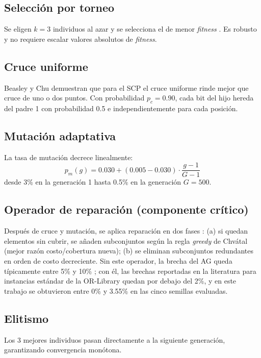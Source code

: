 \documentclass[conference]{IEEEtran}
\begin{document}
\subsection{Selección por torneo}
Se eligen $k=3$ individuos al azar y se selecciona el de menor \textit{fitness} \cite{goldberg1991}. Es robusto y no requiere escalar valores absolutos de \textit{fitness}.

\subsection{Cruce uniforme}
Beasley y Chu \cite{beasley1996} demuestran que para el SCP el cruce uniforme rinde mejor que cruce de uno o dos puntos. Con probabilidad $p_c = 0.90$, cada bit del hijo hereda del padre 1 con probabilidad 0.5 e independientemente para cada posición.

\subsection{Mutación adaptativa}
La tasa de mutación decrece linealmente:
\begin{equation}
p_m(g) = 0.030 + (0.005 - 0.030) \cdot \frac{g-1}{G-1}
\end{equation}
desde 3\% en la generación 1 hasta 0.5\% en la generación $G=500$.

\subsection{Operador de reparación (componente crítico)}
Después de cruce y mutación, se aplica reparación en dos fases \cite{beasley1996}: (a) si quedan elementos sin cubrir, se añaden subconjuntos según la regla \textit{greedy} de Chvátal \cite{chvatal1979} (mejor razón costo/cobertura nueva); (b) se eliminan subconjuntos redundantes en orden de costo decreciente. Sin este operador, la brecha del AG queda típicamente entre 5\% y 10\% \cite{beasley1996}; con él, las brechas reportadas en la literatura para instancias estándar de la OR-Library quedan por debajo del 2\%, y en este trabajo se obtuvieron entre 0\% y 3.55\% en las cinco semillas evaluadas.

\subsection{Elitismo}
Los 3 mejores individuos pasan directamente a la siguiente generación, garantizando convergencia monótona.
\end{document}
